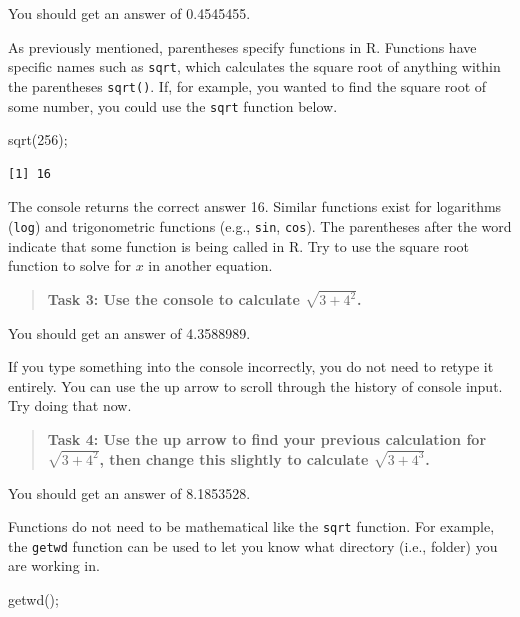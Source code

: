 \documentclass[
]{scrbook}
\newenvironment{Shaded}{\begin{snugshade}}{\end{snugshade}}
\newcommand{\DecValTok}[1]{\textcolor[rgb]{0.00,0.00,0.81}{#1}}
\newcommand{\FunctionTok}[1]{\textcolor[rgb]{0.00,0.00,0.00}{#1}}
\newcommand{\NormalTok}[1]{#1}
\begin{document}
You should get an answer of 0.4545455.

As previously mentioned, parentheses specify functions in R.
Functions have specific names such as \texttt{sqrt}, which calculates the square root of anything within the parentheses \texttt{sqrt()}.
If, for example, you wanted to find the square root of some number, you could use the \texttt{sqrt} function below.

\begin{Shaded}
\begin{Highlighting}[]
\FunctionTok{sqrt}\NormalTok{(}\DecValTok{256}\NormalTok{);}
\end{Highlighting}
\end{Shaded}

\begin{verbatim}
[1] 16
\end{verbatim}

The console returns the correct answer 16.
Similar functions exist for logarithms (\texttt{log}) and trigonometric functions (e.g., \texttt{sin}, \texttt{cos}).
The parentheses after the word indicate that some function is being called in R.
Try to use the square root function to solve for \(x\) in another equation.

\begin{quote}
\textbf{Task 3: Use the console to calculate \(\sqrt{3 + 4^2}\).}
\end{quote}

You should get an answer of 4.3588989.

If you type something into the console incorrectly, you do not need to retype it entirely.
You can use the up arrow to scroll through the history of console input.
Try doing that now.

\begin{quote}
\textbf{Task 4: Use the up arrow to find your previous calculation for \(\sqrt{3 + 4^2}\), then change this slightly to calculate \(\sqrt{3 + 4^3}\).}
\end{quote}

You should get an answer of 8.1853528.

Functions do not need to be mathematical like the \texttt{sqrt} function.
For example, the \texttt{getwd} function can be used to let you know what directory (i.e., folder) you are working in.

\begin{Shaded}
\begin{Highlighting}[]
\FunctionTok{getwd}\NormalTok{();}
\end{Highlighting}
\end{Shaded}
\end{document}
